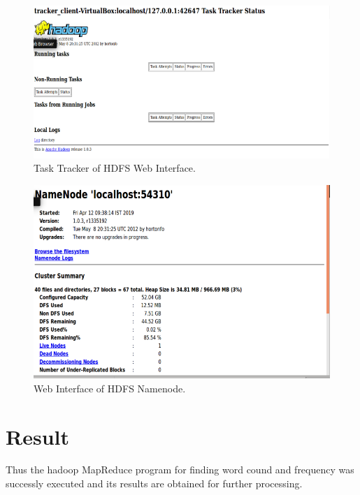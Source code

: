 \documentclass[a4paper,10pt]{article}
\begin{document}
	\begin{figure}[h]
		\includegraphics[scale=0.30,center]{exptTwoScreenShot/fig8.png}
		\caption{Task Tracker of HDFS Web Interface.}
		\label{fig:8}
	\end{figure}

\pagebreak

	\begin{figure}[h]
		\includegraphics[scale=0.30,center]{exptTwoScreenShot/fig9.png}
		\caption{Web Interface of HDFS Namenode.}
		\label{fig:10}
	\end{figure}
  
\section{Result}
Thus the hadoop MapReduce program for finding word cound and frequency was successly executed and its results are obtained for further processing.
\end{document}
